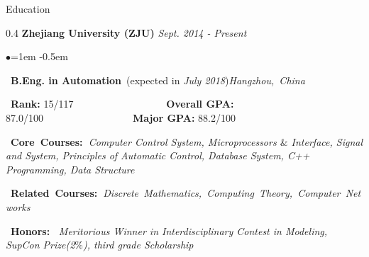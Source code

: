 \documentclass{resume} %
\begin{document}

\begin{rSection}{Education}

\begin{spacing}{0.4}
{\bf \Large{Zhejiang University (ZJU)}} \hfill {\em Sept. 2014 - Present}\smallskip\\
\end{spacing}
\begin{list}{$\bullet$}{\leftmargin=1em} %
   \itemsep -0.5em \vspace{-0.5em} %
\item ~{\bf B.Eng. in Automation}~(expected in {\em July 2018})\hfill{\em Hangzhou,~China}
\item ~{\bf Rank: } 15/117 ~~~~~~~~~~~~~~~~~~{\bf Overall GPA: }87.0/100~~~~~~~~~~~~~~~~~~{\bf Major GPA: }88.2/100
\item ~{\bf Core~Courses:~}{\em Computer Control System, Microprocessors $\&$ Interface, Signal and System, Principles of Automatic Control, Database System, C++ Programming, Data Structure}
\item ~{\bf Related~Courses:~}{\em Discrete~Mathematics,~Computing~Theory,~Computer~Networks}
\item ~{\bfseries Honors:~}
	{\em Meritorious Winner in Interdisciplinary Contest in Modeling, SupCon Prize(2$\%$), third grade Scholarship}
	\end{list}


\end{rSection}

\end{document}
